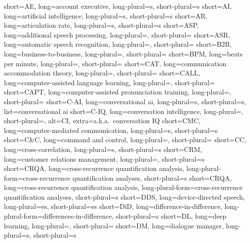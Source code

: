 		{short=AE,		long=account executive,								long-plural=s, short-plural=s}
		{short=AI,		long=artificial intelligence,						long-plural=s, short-plural=s}
		{short=AR,		long=articulation rate,								long-plural=s, short-plural=s}
	{short=ASP,		long=additional speech processing,  				long-plural=, short-plural=}
	{short=ASR, 	long=automatic speech recognition, 					long-plural=, short-plural=}
	{short=B2B, 	long=business-to-business,							long-plural=, short-plural=}
	{short=BPM, 	long=beats per minute, long-plural=, short-plural=}
	{short=CAT, 	long=communication accommodation theory, 			long-plural=, short-plural=}
	{short=CALL, 	long=computer-assisted language learning, 			long-plural=, short-plural=}
	{short=CAPT, 	long=computer-assisted pronunciation training, 		long-plural=, short-plural=}
	{short=C-AI, 	long=conversational \acs*{ai},						long-plural=s, short-plural=s, list=conversational \acs*{ai}}
	{short=C-IQ,	long=conversation intelligence, 					long-plural=, short-plural=, alt=CI, extra=a.k.a.\ conversation IQ}
	{short=CMC, 	long=computer-mediated communication, 				long-plural=s, short-plural=s}
	{short=C\&C, 	long=command and control, 							long-plural=, short-plural=}
		{short=CC, 		long=cross-correlation,								long-plural=s, short-plural=s}
	{short=CRM, 	long=customer relations management,					long-plural=, short-plural=s}
	{short=CRQA, 	long=cross-recurrence quantification analysis,		long-plural-form=cross-recurrence quantification analyses, short-plural=s}
	{short=CRQA, 	long=cross-recurrence quantification analysis,		long-plural-form=cross-recurrence quantification analyses, short-plural=s}
	{short=DDS, 	long=device-directed speech, 						long-plural=es, short-plural=es}
	{short=DiD, 	long=difference-in-difference, 						long-plural-form=differences-in-difference, short-plural=s}
		{short=DL,		long=deep learning,									long-plural=, short-plural=}
		{short=DM,		long=dialogue manager,								long-plural=s, short-plural=s}

